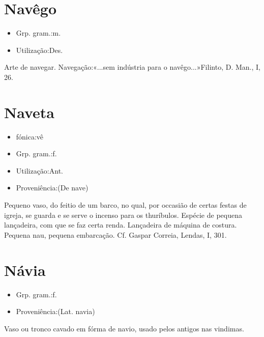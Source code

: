 \section{Navêgo}
\begin{itemize}
\item {Grp. gram.:m.}
\end{itemize}
\begin{itemize}
\item {Utilização:Des.}
\end{itemize}
Arte de navegar.
Navegação:«\textunderscore ...sem indústria para o navêgo...\textunderscore »Filinto, \textunderscore D. Man.\textunderscore , I, 26.
\section{Naveta}
\begin{itemize}
\item {fónica:vê}
\end{itemize}
\begin{itemize}
\item {Grp. gram.:f.}
\end{itemize}
\begin{itemize}
\item {Utilização:Ant.}
\end{itemize}
\begin{itemize}
\item {Proveniência:(De \textunderscore nave\textunderscore )}
\end{itemize}
Pequeno vaso, do feitio de um barco, no qual, por occasião de certas festas de igreja, se guarda e se serve o incenso para os thuríbulos.
Espécie de pequena lançadeira, com que se faz certa renda.
Lançadeira de máquina de costura.
Pequena nau, pequena embarcação. Cf. Gaspar Correia, \textunderscore Lendas\textunderscore , I, 301.
\section{Návia}
\begin{itemize}
\item {Grp. gram.:f.}
\end{itemize}
\begin{itemize}
\item {Proveniência:(Lat. \textunderscore navia\textunderscore )}
\end{itemize}
Vaso ou tronco cavado em fórma de navio, usado pelos antigos nas vindimas.
